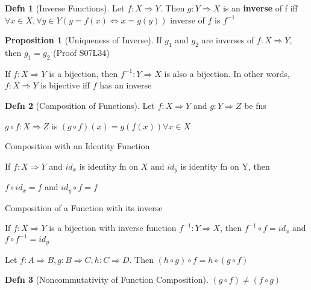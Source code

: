 \documentclass[a4paper]{article}
\theoremstyle{definition}
\newtheorem*{defn}{Defn}
\newtheorem*{propos}{Proposition}
\newenvironment{theorem}[1]
  {\renewcommand\theinnertheorem{#1}\innertheorem}
  {\endinnertheorem}
\begin{document}
\begin{defn}[Inverse Functions] Let $f: X \Rightarrow Y$. Then $g: Y \Rightarrow X$ is an \textbf{inverse} of f iff\\
    $\forall x \in X, \forall y \in Y (y = f(x) \Leftrightarrow x = g(y))$
    inverse of $f$ is $f^{-1}$
\end{defn}


\begin{propos}[Uniqueness of Inverse] If $g_1$ and $g_2$ are inverses of $f: X \Rightarrow Y$, then $g_1 = g_2$ (Proof S07L34)
\end{propos}

\begin{theorem}{7.2.3} If $f: X \Rightarrow Y$ is a bijection, then $f^{-1}: Y \Rightarrow X$ is also a bijection. In other words, $f: X \Rightarrow Y$ is bijective iff $f$ has an inverse
\end{theorem}

\begin{defn}[Composition of Functions] Let $f: X \Rightarrow Y$  and $g: Y \Rightarrow Z$ be fns

  $g \circ f: X \Rightarrow Z$ is $(g \circ f)(x) = g(f(x)) \forall x \in X$
\end{defn}

\begin{theorem}{7.3.1} Composition with an Identity Function

  If $f: X \Rightarrow Y$ and $id_x$ is identity fn on $X$ and $id_y$ is identity fn on Y, then
  
  $f \circ id_x = f$ and $id_y \circ f = f$
\end{theorem}

\begin{theorem}{7.3.2} Composition of a Function with its inverse

  If $f: X \Rightarrow Y$ is a bijection with inverse function $f^{-1}: Y \Rightarrow X$, then $f^{-1} \circ f = id_x$ and $f \circ f^{-1} = id_y$
\end{theorem}

\begin{theorem}{Associativity of Function Composition}

  Let $f: A \Rightarrow B, g: B \Rightarrow C, h: C \Rightarrow D$. Then $(h \circ g) \circ f = h \circ (g \circ f)$
\end{theorem}

\begin{defn}[Noncommutativity of Function Composition]
  $(g \circ f) \not = (f \circ g)$
\end{defn}
\end{document}
